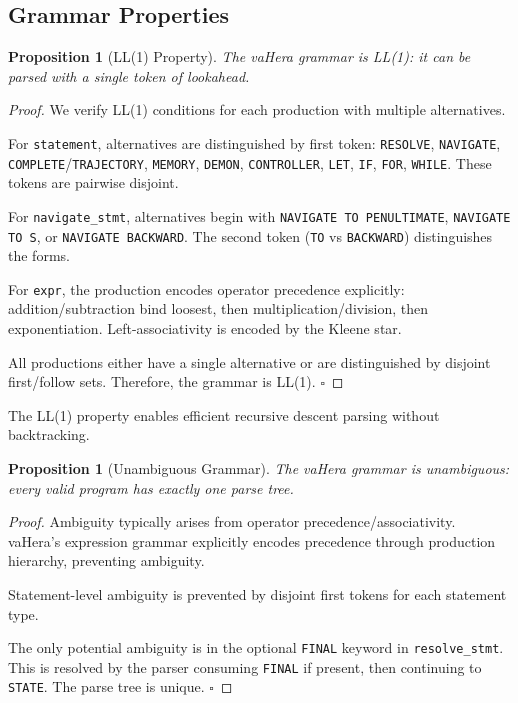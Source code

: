 \documentclass[twocolumn,10pt]{article}
\newtheorem{proposition}[theorem]{Proposition}
\theoremstyle{definition}
\theoremstyle{remark}
\begin{document}
\subsection{Grammar Properties}

\begin{proposition}[LL(1) Property]
The vaHera grammar is LL(1): it can be parsed with a single token of lookahead.
\end{proposition}

\begin{proof}
We verify LL(1) conditions for each production with multiple alternatives.

For \texttt{statement}, alternatives are distinguished by first token: \texttt{RESOLVE}, \texttt{NAVIGATE}, \texttt{COMPLETE}/\texttt{TRAJECTORY}, \texttt{MEMORY}, \texttt{DEMON}, \texttt{CONTROLLER}, \texttt{LET}, \texttt{IF}, \texttt{FOR}, \texttt{WHILE}. These tokens are pairwise disjoint.

For \texttt{navigate\_stmt}, alternatives begin with \texttt{NAVIGATE TO PENULTIMATE}, \texttt{NAVIGATE TO S}, or \texttt{NAVIGATE BACKWARD}. The second token (\texttt{TO} vs \texttt{BACKWARD}) distinguishes the forms.

For \texttt{expr}, the production encodes operator precedence explicitly: addition/subtraction bind loosest, then multiplication/division, then exponentiation. Left-associativity is encoded by the Kleene star.

All productions either have a single alternative or are distinguished by disjoint first/follow sets. Therefore, the grammar is LL(1). $\square$
\end{proof}

The LL(1) property enables efficient recursive descent parsing without backtracking.

\begin{proposition}[Unambiguous Grammar]
The vaHera grammar is unambiguous: every valid program has exactly one parse tree.
\end{proposition}

\begin{proof}
Ambiguity typically arises from operator precedence/associativity. vaHera's expression grammar explicitly encodes precedence through production hierarchy, preventing ambiguity.

Statement-level ambiguity is prevented by disjoint first tokens for each statement type.

The only potential ambiguity is in the optional \texttt{FINAL} keyword in \texttt{resolve\_stmt}. This is resolved by the parser consuming \texttt{FINAL} if present, then continuing to \texttt{STATE}. The parse tree is unique. $\square$
\end{proof}
\end{document}
